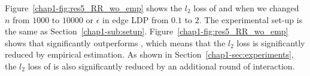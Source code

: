 
Figure~\ref{chap1-fig:res5_RR_wo_emp} shows the $l_2$ loss of  and  when we changed $n$ from $1000$ to $10000$ or $\epsilon$ in edge LDP from $0.1$ to $2$. 
The experimental set-up is the same as Section~\ref{chap1-sub:setup}. 
Figure~\ref{chap1-fig:res5_RR_wo_emp} shows that  significantly outperforms , which means that the $l_2$ loss is significantly reduced by empirical estimation. 
As shown in Section~\ref{chap1-sec:experiments}, the $l_2$ loss of  is also significantly reduced by an additional round of interaction.


